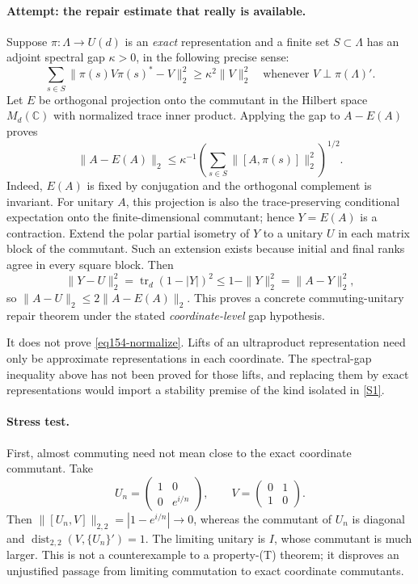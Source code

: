\documentclass[11pt,a4paper]{article}
\newcommand{\C}{\mathbb{C}}
\newcommand{\sref}[2]{\hyperlink{source:#1:#2}{[S#2]}}
\numberwithin{equation}{section}
\begin{document}
\paragraph{Attempt: the repair estimate that really is available.}
Suppose $\pi:\Lambda\to U(d)$ is an \emph{exact} representation and a finite
set $S\subset\Lambda$ has an adjoint spectral gap $\kappa>0$, in the
following precise sense:
\[
 \sum_{s\in S}\|\pi(s)V\pi(s)^*-V\|_2^2
 \ge\kappa^2\|V\|_2^2
 \quad\text{whenever }V\perp\pi(\Lambda)'.
\]
Let $E$ be orthogonal projection onto the commutant in the Hilbert space
$M_d(\C)$ with normalized trace inner product. Applying the gap to $A-E(A)$
proves
\begin{equation}\label{eq154-gap}
 \|A-E(A)\|_2\le\kappa^{-1}
 \left(\sum_{s\in S}\|[A,\pi(s)]\|_2^2\right)^{1/2}.
\end{equation}
Indeed, $E(A)$ is fixed by conjugation and the orthogonal complement is
invariant. For unitary $A$, this projection is also the trace-preserving
conditional expectation onto the finite-dimensional commutant; hence
$Y=E(A)$ is a contraction. Extend the polar partial isometry of $Y$ to a
unitary $U$ in each matrix block of the commutant. Such an extension exists
because initial and final ranks agree in every square block. Then
\[
 \|Y-U\|_2^2=\operatorname{tr}_d(1-|Y|)^2
 \le1-\|Y\|_2^2=\|A-Y\|_2^2,
\]
so $\|A-U\|_2\le2\|A-E(A)\|_2$.
This proves a concrete commuting-unitary repair theorem under the stated
\emph{coordinate-level} gap hypothesis.

It does not prove \eqref{eq154-normalize}. Lifts of an ultraproduct
representation need only be approximate representations in each coordinate.
The spectral-gap inequality above has not been proved for those lifts, and
replacing them by exact representations would import a stability premise of
the kind isolated in \sref{statement}{1}.

\paragraph{Stress test.}
First, almost commuting need not mean close to the exact coordinate
commutant. Take
\[
 U_n=\begin{pmatrix}1&0\\0&e^{i/n}\end{pmatrix},\qquad
 V=\begin{pmatrix}0&1\\1&0\end{pmatrix}.
\]
Then $\|[U_n,V]\|_{2,2}=|1-e^{i/n}|\to0$, whereas the commutant of $U_n$
is diagonal and $\operatorname{dist}_{2,2}(V,\{U_n\}')=1$. The limiting
unitary is $I$, whose commutant is much larger. This is not a counterexample
to a property-(T) theorem; it disproves an unjustified passage from limiting
commutation to exact coordinate commutants.
\end{document}
